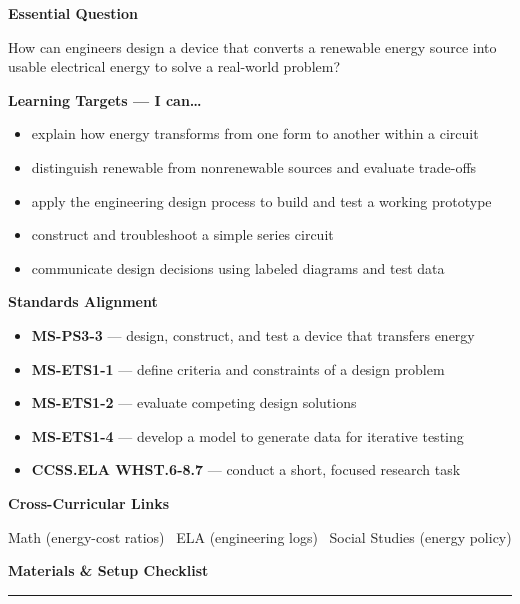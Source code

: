 \documentclass[11pt,a4paper,parskip=half]{scrartcl}
\newcommand{\plansection}[2]{%
  \vspace{12pt}%
  {\color{stemteal}\Large\bfseries #1\ \textcolor{stemamber}{\normalsize\faIcon{#2}}}\par
  {\color{stemamber}\rule{\linewidth}{1.1pt}}\par
  \vspace{4pt}%
}
\begin{document}
\noindent
\begin{minipage}[t]{0.48\textwidth}
\textbf{\color{stemslate}Essential Question}\par
\small How can engineers design a device that converts a renewable energy source into usable electrical energy to solve a real-world problem?
\vspace{8pt}

\textbf{\color{stemslate}Learning Targets --- I can\ldots}
\begin{itemize}[leftmargin=14pt,itemsep=2pt,topsep=4pt]
  \small
  \item explain how energy transforms from one form to another within a circuit
  \item distinguish renewable from nonrenewable sources and evaluate trade-offs
  \item apply the engineering design process to build and test a working prototype
  \item construct and troubleshoot a simple series circuit
  \item communicate design decisions using labeled diagrams and test data
\end{itemize}
\end{minipage}%
\hfill
\begin{minipage}[t]{0.48\textwidth}
\textbf{\color{stemslate}Standards Alignment}
\begin{itemize}[leftmargin=14pt,itemsep=2pt,topsep=4pt]
  \small
  \item[] \textbf{MS-PS3-3} --- design, construct, and test a device that transfers energy
  \item[] \textbf{MS-ETS1-1} --- define criteria and constraints of a design problem
  \item[] \textbf{MS-ETS1-2} --- evaluate competing design solutions
  \item[] \textbf{MS-ETS1-4} --- develop a model to generate data for iterative testing
  \item[] \textbf{CCSS.ELA WHST.6-8.7} --- conduct a short, focused research task
\end{itemize}
\vspace{4pt}
\textbf{\color{stemslate}Cross-Curricular Links}\par
\small Math (energy-cost ratios) \textbullet\ ELA (engineering logs) \textbullet\ Social Studies (energy policy)
\end{minipage}
\par

\plansection{Materials \& Setup Checklist}{list-ul}
\end{document}
